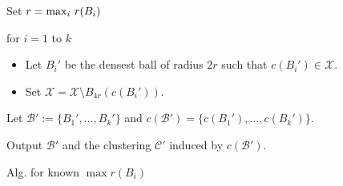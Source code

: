 \documentclass[twoside]{article}
\newcommand{\mc}{\mathcal}
\newenvironment{alg}{
    \begin{list}{}{
        \setlength{\itemsep}{2pt}
        \setlength{\parsep}{0pt}
        \setlength{\parskip}{0pt}
        \setlength{\topsep}{1pt}
    }
}
{
    \end{list}
}
\begin{document}
\begin{algorithm}
\begin{alg}
	\item[] Set $r = \max_i \thinspace r(B_i)$
	\item[] for $i=1$ to $k$
	\begin{itemize}
		\item[] Let $B_i'$ be the densest ball of radius $2r$ such that $c(B_i') \in \mathcal{X}$.
		\item[] Set $\mc X=\mc X\setminus B_{4r}(c(B_i'))$. 
	\end{itemize}
\item[] Let $\mc B' := \{B_1',\ldots,B_k'\}$ and $c(\mc B') = \{c(B_1'),\ldots,c(B_k')\}$.
\item[] Output $\mc B'$ and the clustering $\mc C'$ induced by $c(\mc B')$.
\label{alg:NotKnown}
\end{alg}
\caption{Alg. for known $\max{r(B_i)}$}
\end{algorithm}
\end{document}
